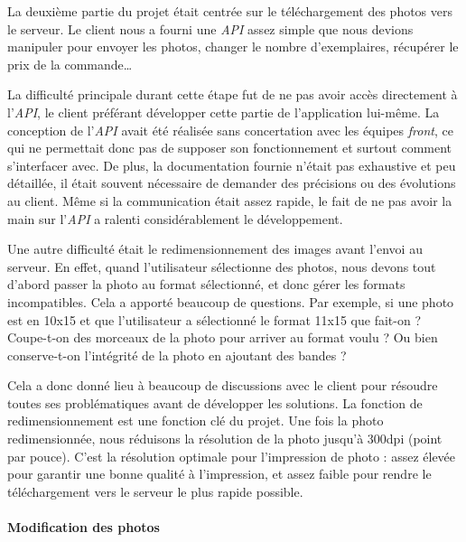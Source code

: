 \documentclass[12pt,a4paper]{article}
\begin{document}
  \bigskip

  La deuxième partie du projet était centrée sur le téléchargement des
  photos vers le serveur. Le client nous a fourni une \emph{API} assez
  simple que nous devions manipuler pour envoyer les photos, changer le
  nombre d'exemplaires, récupérer le prix de la commande\ldots{}

  \bigskip

  La difficulté principale durant cette étape fut de ne pas avoir accès
  directement à l'\emph{API}, le client préférant développer cette partie
  de l'application lui-même. La conception de l'\emph{API} avait été
  réalisée sans concertation avec les équipes \emph{front}, ce qui ne
  permettait donc pas de supposer son fonctionnement et surtout comment
  s'interfacer avec. De plus, la documentation fournie n'était pas
  exhaustive et peu détaillée, il était souvent nécessaire de demander des
  précisions ou des évolutions au client. Même si la communication était
  assez rapide, le fait de ne pas avoir la main sur l'\emph{API} a ralenti
  considérablement le développement.

  \bigskip

  Une autre difficulté était le redimensionnement des images avant l'envoi
  au serveur. En effet, quand l'utilisateur sélectionne des photos, nous
  devons tout d'abord passer la photo au format sélectionné, et donc gérer
  les formats incompatibles. Cela a apporté beaucoup de questions. Par
  exemple, si une photo est en 10x15 et que l'utilisateur a sélectionné le
  format 11x15 que fait-on ? Coupe-t-on des morceaux de la photo pour
  arriver au format voulu ? Ou bien conserve-t-on l'intégrité de la photo
  en ajoutant des bandes ?

  \bigskip

  Cela a donc donné lieu à beaucoup de discussions avec le client pour
  résoudre toutes ses problématiques avant de développer les solutions. La
  fonction de redimensionnement est une fonction clé du projet. Une fois
  la photo redimensionnée, nous réduisons la résolution de la photo
  jusqu'à 300dpi (point par pouce). C'est la résolution optimale pour
  l'impression de photo : assez élevée pour garantir une bonne qualité à
  l'impression, et assez faible pour rendre le téléchargement vers le
  serveur le plus rapide possible.

  \bigskip

  \paragraph{Modification des photos}\label{modification-des-photos}
\end{document}
